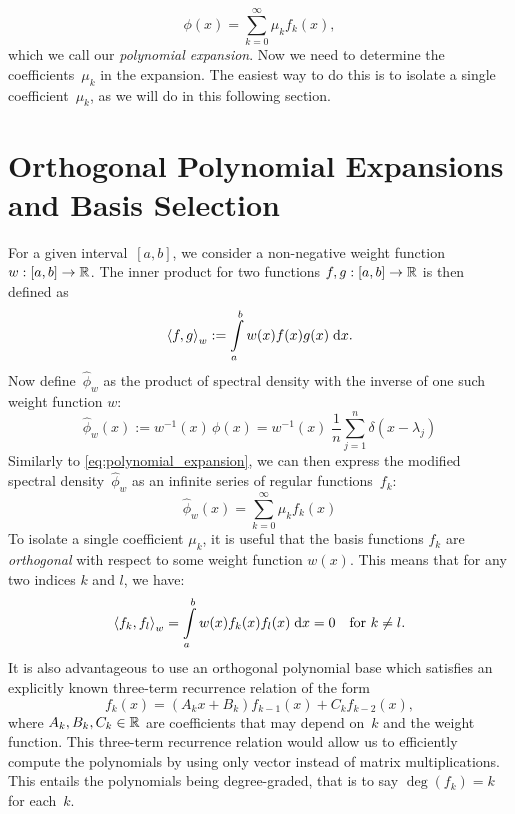 \begin{equation} \label{eq:polynomial_expansion}
    \phi(x) = \sum_{k=0}^{\infty} \mu_k f_k(x),
\end{equation}
which we call our \emph{polynomial expansion}. Now we need to determine the coefficients~$\mu_k$ in the expansion. The easiest way to do this is to isolate a single coefficient~$\mu_k$, as we will do in this following section.

\section{Orthogonal Polynomial Expansions and Basis Selection}
For a given interval~$[a, b]$, we consider a non-negative weight function $w: [a, b] \to \mathbb{R}$. The inner product for two functions $f, g: [a, b] \to \mathbb{R}$ is then defined as
\begin{equation} \label{eq:inner_product}
    \left \langle f, g \right \rangle_w := \int\limits_a^b w(x) f(x) g(x) \;\mathrm{d}x.
\end{equation}
Now define~$\hat{\phi}_w$ as the product of spectral density with the inverse of one such weight function $w$:
\begin{equation} \label{eq:phi_hat}
\hat{\phi}_w(x) := w^{-1}(x) \, \phi(x) =  w^{-1}(x) \; \frac{1}{n} \sum_{j = 1}^n \delta(x - \lambda_j)
\end{equation}
Similarly to \eqref{eq:polynomial_expansion}, we can then express the modified spectral density~$\hat{\phi}_w$ as an infinite series of regular functions~$f_k$:
\begin{equation} \label{eq:phi_hat_polynomial_expansion}
    \hat{\phi}_w(x) = \sum_{k = 0}^{\infty} \mu_k f_k(x)
\end{equation}
To isolate a single coefficient $\mu_k$, it is useful that the basis functions $f_k$ are \emph{orthogonal} with respect to some weight function $w(x)$. This means that for any two indices $k$ and $l$, we have:
\[
\left \langle f_k, f_l \right \rangle_w = \int \limits_{a}^b w(x) f_k(x) f_l(x) \;\mathrm{d}x = 0 \quad \text{for } k \neq l.
\]
It is also advantageous to use an orthogonal polynomial base which satisfies an explicitly known three-term recurrence relation of the form
\[
f_{k}(x) = (A_k x + B_k) f_{k-1}(x) + C_k f_{k-2}(x),
\]
where $A_k, B_k, C_k \in \mathbb{R}$ are coefficients that may depend on~$k$ and the weight function. This three-term recurrence relation would allow us to efficiently compute the polynomials by using only vector instead of matrix multiplications. This entails the polynomials being degree-graded, that is to say $\deg(f_k) = k$ for each~$k$.

